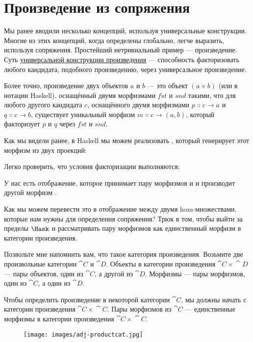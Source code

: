 \section{Произведение из сопряжения}

Мы ранее вводили несколько концепций, используя универсальные
конструкции. Многие из этих концепций, когда определены глобально, легче
выразить, используя сопряжения. Простейший нетривиальный пример ---
произведение. Суть \hyperref[products-and-coproducts]{универсальной
  конструкции произведения} --- способность факторизовать любого
кандидата, подобного произведению, через универсальное произведение.

Более точно, произведение двух объектов $a$ и $b$ ---
это объект $(a\times{}b)$ (или  в нотации Haskell),
оснащённый двумя морфизмами $\mathit{fst}$ и $\mathit{snd}$ такими,
что для любого другого кандидата $c$, оснащённого двумя морфизмами
$p \Colon c \to a$ и $q \Colon c \to b$, существует
уникальный морфизм $m \Colon c \to (a, b)$, который
факторизует $p$ и $q$ через $\mathit{fst}$ и $\mathit{snd}$.

Как мы видели ранее, в Haskell мы можем реализовать , который генерирует этот
морфизм из двух проекций:

Легко проверить, что условия факторизации выполняются:

У нас есть отображение, которое принимает пару морфизмов  и
 и производит другой морфизм
.

Как мы можем перевести это в отображение между двумя hom-множествами, которые нам
нужны для определения сопряжения? Трюк в том, чтобы выйти за пределы
$\Hask$ и рассматривать пару морфизмов как единственный морфизм в
категории произведения.

Позвольте мне напомнить вам, что такое категория произведения. Возьмите две произвольные
категории $\cat{C}$ и $\cat{D}$. Объекты в категории произведения
$\cat{C}\times{}\cat{D}$ --- пары объектов, один из $\cat{C}$, а другой из
$\cat{D}$. Морфизмы --- пары морфизмов, один из $\cat{C}$, а
один из $\cat{D}$.

Чтобы определить произведение в некоторой категории $\cat{C}$, мы должны начать с
категории произведения $\cat{C}\times{}\cat{C}$. Пары морфизмов из $\cat{C}$ --- единственные
морфизмы в категории произведения $\cat{C}\times{}\cat{C}$.

\begin{figure}[H]
  \centering
  \texttt{[image: images/adj-productcat.jpg]}
\end{figure}

